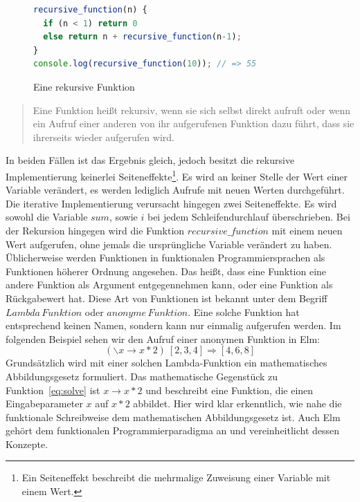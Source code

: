 \begin{figure}[h!]
\begin{lstlisting}[language=JavaScript]
recursive_function(n) {
  if (n < 1) return 0
  else return n + recursive_function(n-1);
}
console.log(recursive_function(10)); // => 55
\end{lstlisting}
\caption{Eine rekursive Funktion}\label{fig:recursive-function}
\end{figure}
\begin{quote}
\glqq Eine Funktion heißt rekursiv, wenn sie sich selbst direkt aufruft oder wenn ein Aufruf einer anderen von ihr aufgerufenen Funktion dazu führt, dass sie ihrerseits wieder aufgerufen wird.\grqq\cite{rekursive-funktion}
\end{quote}
In beiden Fällen ist das Ergebnis gleich, jedoch besitzt die rekursive Implementierung keinerlei Seiteneffekte\footnote{Ein Seiteneffekt beschreibt die mehrmalige Zuweisung einer Variable mit einem Wert.}. Es wird an keiner Stelle der Wert einer Variable verändert, es werden lediglich Aufrufe mit neuen Werten durchgeführt. Die iterative Implementierung verursacht hingegen zwei Seiteneffekte. Es wird sowohl die Variable $sum$, sowie $i$ bei jedem Schleifendurchlauf überschrieben. Bei der Rekursion hingegen wird  die Funktion $recursive\_function$
mit einem neuen Wert aufgerufen, ohne jemals die ursprüngliche Variable verändert zu haben.
Üblicherweise werden Funktionen in funktionalen Programmiersprachen als Funktionen höherer Ordnung angesehen. Das heißt, dass eine Funktion eine andere Funktion als Argument entgegennehmen kann, oder eine Funktion als Rückgabewert hat. Diese Art von Funktionen ist bekannt unter dem Begriff $Lambda\,Funktion$ oder $anonyme\,Funktion$. Eine solche Funktion hat entsprechend keinen Namen, sondern kann nur einmalig aufgerufen werden. Im folgenden Beispiel sehen wir den Aufruf einer anonymen Funktion in Elm:
\begin{equation} \label{eq:solve}
(\backslash x \rightarrow x * 2)\ [ 2, 3, 4 ] \Longrightarrow [4, 6, 8]
\end{equation}
Grundsätzlich wird mit einer solchen Lambda-Funktion ein mathematisches Abbildungsgesetz formuliert. Das mathematische Gegenstück zu Funktion~\ref{eq:solve} ist $x \rightarrow x * 2$ und beschreibt eine Funktion, die einen Eingabeparameter $x$ auf $x*2$ abbildet. Hier wird klar erkenntlich, wie nahe die funktionale Schreibweise dem mathematischen Abbildungsgesetz ist. Auch Elm gehört dem funktionalen Programmierparadigma an und vereinheitlicht dessen Konzepte.


